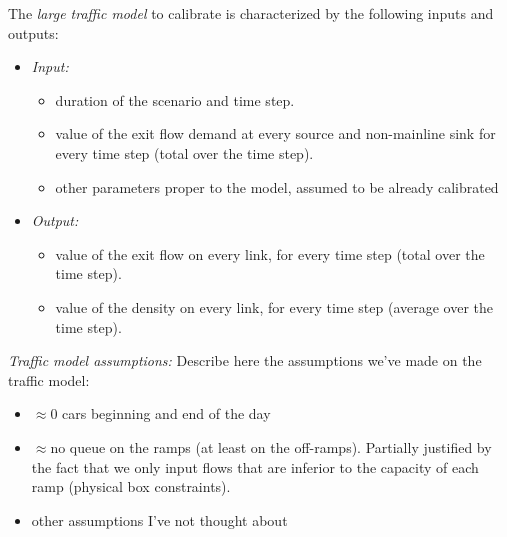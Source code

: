 The \emph{large traffic model} to calibrate is characterized by the following inputs and outputs:
\begin{itemize}
	\item \emph{Input:} 
	\begin{itemize}
		\item   duration of the scenario and time step.
		\item   value of the exit flow demand at every source and non-mainline sink for every time step (total over the time step).
		\item	other parameters proper to the model, assumed to be already calibrated
	\end{itemize}
	\item \emph{Output:}
	\begin{itemize}
		\item   value of the exit flow on every link, for every time step (total over the time step).
		\item	value of the density on every link, for every time step (average over the time step).		
	\end{itemize}
\end{itemize}
\emph{Traffic model assumptions:} \color{red}Describe here the assumptions we've made on the traffic model:\color{black}
\begin{itemize}
	\item $\approx 0$ cars beginning and end of the day
	\item $\approx$no queue on the ramps (at least on the off-ramps). Partially justified by the fact that we only input flows that are inferior to the capacity of each ramp (physical box constraints).
	\item other assumptions I've not thought about
\end{itemize}
